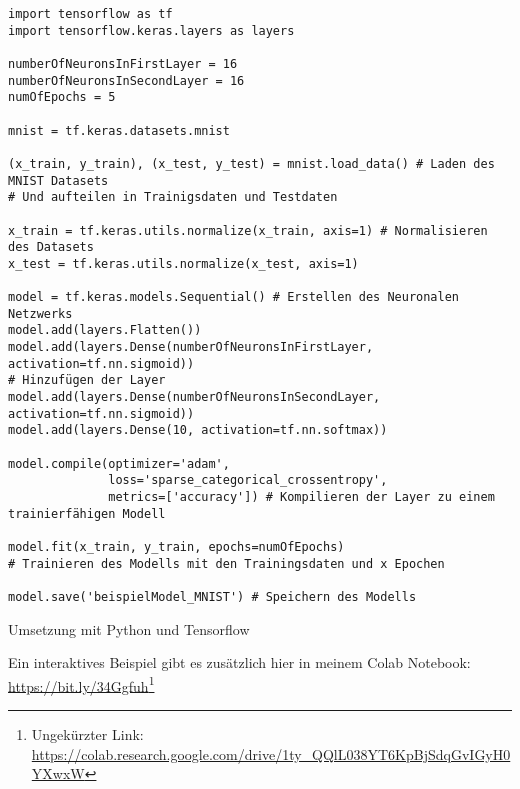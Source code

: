 \begin{listing}[H]
    \begin{verbatim}
import tensorflow as tf
import tensorflow.keras.layers as layers

numberOfNeuronsInFirstLayer = 16 
numberOfNeuronsInSecondLayer = 16 
numOfEpochs = 5 

mnist = tf.keras.datasets.mnist

(x_train, y_train), (x_test, y_test) = mnist.load_data() # Laden des MNIST Datasets
# Und aufteilen in Trainigsdaten und Testdaten

x_train = tf.keras.utils.normalize(x_train, axis=1) # Normalisieren des Datasets
x_test = tf.keras.utils.normalize(x_test, axis=1)

model = tf.keras.models.Sequential() # Erstellen des Neuronalen Netzwerks
model.add(layers.Flatten())
model.add(layers.Dense(numberOfNeuronsInFirstLayer, activation=tf.nn.sigmoid))
# Hinzufügen der Layer
model.add(layers.Dense(numberOfNeuronsInSecondLayer, activation=tf.nn.sigmoid))
model.add(layers.Dense(10, activation=tf.nn.softmax))

model.compile(optimizer='adam',
              loss='sparse_categorical_crossentropy',
              metrics=['accuracy']) # Kompilieren der Layer zu einem trainierfähigen Modell

model.fit(x_train, y_train, epochs=numOfEpochs)
# Trainieren des Modells mit den Trainingsdaten und x Epochen

model.save('beispielModel_MNIST') # Speichern des Modells

    \end{verbatim}
    \caption{Umsetzung mit Python und Tensorflow}
\end{listing}
Ein interaktives Beispiel gibt es zusätzlich hier in meinem Colab Notebook: \url{https://bit.ly/34Ggfuh}\footnote{Ungekürzter Link: \url{https://colab.research.google.com/drive/1ty_QQlL038YT6KpBjSdqGvIGyH0YXwxW}}